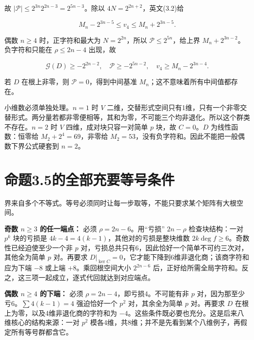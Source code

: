 \documentclass[UTF8,fontset=fandol,zihao=-4,openany,oneside]{ctexbook}
\begin{document}
故 \(|\mathcal P|\le2^{3n}2^{2n-3}=2^{5n-3}\)。除以 \(4N=2^{2n+2}\)，英文(3.2)给



\[
M_n-2^{3n-5}\le v_4\le M_n+2^{3n-5}.
\]



偶数 \(n\ge4\) 时，正字符和最大为 \(N=2^{2n}\)，所以 \(\mathcal P\le2^{5n}\)，给上界 \(M_n+2^{3n-2}\)。负字符和只能在 \(\rho\le2n-4\) 出现，故



\[
\mathcal G(D)\ge-2^{2n-2},\quad
\mathcal P\ge-2^{5n-2},\quad
v_4\ge M_n-2^{3n-4}.
\]



若 \(D\) 在根上非零，则 \(\mathcal P=0\)，得到中间基准 \(M_n\)；这不意味着所有中间值都存在。



小维数必须单独处理。\(n=1\) 时 \(V\) 二维，交替形式空间只有1维，只有一个非零交替形式。两分量若都非零便相等，其和为零，不可能三个均非退化。所以这个群类不存在。\(n=2\) 时 \(V\) 四维，成对块只容一对简单 \(p\) 块，故 \(C=0\)。\(D\) 为线性函数：恒零给 \(M_2+2^{4}=69\)，非零给 \(M_2=53\)，没有负字符和。因此不能把一般偶数下界公式硬套到 \(n=2\)。



\section{命题3.5的全部充要等号条件}


界来自多个不等式。等号必须同时让每一步取等，不能只要求某个矩阵有大根空间。



\textbf{奇数 \(n\ge3\) 的任一端点：} 必须 \(\rho=2n-6\)。用“亏损” \(2n-\rho\) 检查块结构：一对 \(p^k\) 块的亏损是 \(4k-4=4(k-1)\)，其他对的亏损是整块维数 \(2k\deg f\ge6\)。奇数性已经迫使至少一个非 \(p\) 对，亏损总共只有6，因此恰好一个简单不可约三次对，其他全为简单 \(p\) 对。再要求 \(D|_{\ker C}=0\)，它才能下降到6维非退化商；该商字符和应为下端 \(-8\) 或上端 \(+8\)。乘回根空间大小 \(2^{2n-6}\) 后，正好给所需全局字符和。反之，这三项一起成立，逐式代回就达到对应端点。



\textbf{偶数 \(n\ge4\) 的下端：} 必须 \(\rho=2n-4\)，即亏损4。不可能有非 \(p\) 对，因为那至少亏6。\(\sum4(k-1)=4\) 强迫恰好一个 \(p^2\) 对，其余全为简单 \(p\) 对。再要求 \(D\) 在根上为零，以及4维非退化商的字符和为 \(-4\)。这些条件既必要也充分。这是后来八维核心的结构来源：一对 \(p^2\) 模各4维，共8维；并不是先看到某个八维例子，再假定所有等号群都含它。
\end{document}
